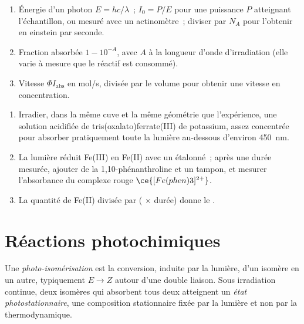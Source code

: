 \begin{method}\label{met:b3:photochemistry:photochemical-rate}
\begin{enumerate}
  \item Énergie d'un photon $E = hc/\lambda$~;  $I_0 = P/E$
        pour une puissance $P$ atteignant l'échantillon, ou mesuré avec un
        actinomètre~; diviser par $N_A$ pour l'obtenir en einstein par
        seconde.
  \item Fraction absorbée $1 - 10^{-A}$, avec $A$ à la longueur d'onde
        d'irradiation (elle varie à mesure que le réactif est consommé).
  \item Vitesse $\Phi I_{\mathrm{abs}}$ en mol/s, divisée par le volume pour
        obtenir une vitesse en concentration.
\end{enumerate}
\end{method}

\begin{method}\label{met:b3:photochemistry:actinometry}
\begin{enumerate}
  \item Irradier, dans la même cuve et la même géométrie que l'expérience,
        une solution acidifiée de tris(oxalato)ferrate(III) de potassium,
        assez concentrée pour absorber pratiquement toute la lumière
        au-dessous d'environ \qty{450}{nm}.
  \item La lumière réduit Fe(III) en Fe(II) avec un 
        étalonné~; après une durée mesurée, ajouter de la
        1,10-phénanthroline et un tampon, et mesurer
        l'absorbance du complexe rouge $\ce{[Fe(phen)3]^{2+}}$.
  \item La quantité de Fe(II) divisée par ( $\times$
        durée) donne le .
\end{enumerate}
\end{method}

\section{Réactions photochimiques}

\begin{definition}\label{def:b3:photochemistry:photoisomerisation}
Une \emph{photo-isomérisation} est la conversion, induite
par la lumière, d'un isomère en un autre, typiquement $E \to Z$ autour
d'une double liaison. Sous irradiation continue, deux isomères qui
absorbent tous deux atteignent un
\emph{état photostationnaire}, une composition
stationnaire fixée par la lumière et non par la thermodynamique.
\end{definition}

